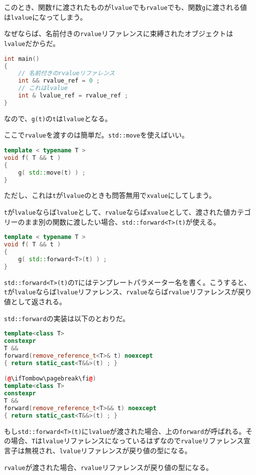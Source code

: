 このとき、関数\texttt{f}に渡されたものが\texttt{lvalue}でも\texttt{rvalue}でも、関数\texttt{g}に渡される値は\texttt{lvalue}になってしまう。

なぜならば、名前付きの\texttt{rvalue}リファレンスに束縛されたオブジェクトは\texttt{lvalue}だからだ。

\begin{lstlisting}[language={C++}]
int main()
{
    // 名前付きのrvalueリファレンス
    int && rvalue_ref = 0 ;
    // これはlvalue
    int & lvalue_ref = rvalue_ref ;
}
\end{lstlisting}

なので、\texttt{g(t)}の\texttt{t}は\texttt{lvalue}となる。

ここで\texttt{rvalue}を渡すのは簡単だ。\texttt{std::move}を使えばいい。

\begin{lstlisting}[language={C++}]
template < typename T >
void f( T && t )
{
    g( std::move(t) ) ;
}
\end{lstlisting}

ただし、これは\texttt{t}が\texttt{lvalue}のときも問答無用で\texttt{xvalue}にしてしまう。

\texttt{t}が\texttt{lvalue}ならば\texttt{lvalue}として、\texttt{rvalue}ならば\texttt{xvalue}として、渡された値カテゴリーのまま別の関数に渡したい場合、\texttt{std::forward<T>(t)}が使える。

\begin{lstlisting}[language={C++}]
template < typename T >
void f( T && t )
{
    g( std::forward<T>(t) ) ;
}
\end{lstlisting}

\texttt{std::forward<T>(t)}の\texttt{T}にはテンプレートパラメーター名を書く。こうすると、\texttt{t}が\texttt{lvalue}ならば\texttt{lvalue}リファレンス、\texttt{rvalue}ならば\texttt{rvalue}リファレンスが戻り値として返される。

\texttt{std::forward}の実装は以下のとおりだ。

\begin{lstlisting}[language={C++}]
template<class T>
constexpr 
T &&
forward(remove_reference_t<T>& t) noexcept
{ return static_cast<T&&>(t) ; }

(@\ifTombow\pagebreak\fi@)
template<class T>
constexpr 
T &&
forward(remove_reference_t<T>&& t) noexcept
{ return static_cast<T&&>(t) ; }
\end{lstlisting}

もし\texttt{std::forward<T>(t)}に\texttt{lvalue}が渡された場合、上の\texttt{forward}が呼ばれる。その場合、\texttt{T}は\texttt{lvalue}リファレンスになっているはずなので\texttt{rvalue}リファレンス宣言子は無視され、\texttt{lvalue}リファレンスが戻り値の型になる。

\texttt{rvalue}が渡された場合、\texttt{rvalue}リファレンスが戻り値の型になる。
